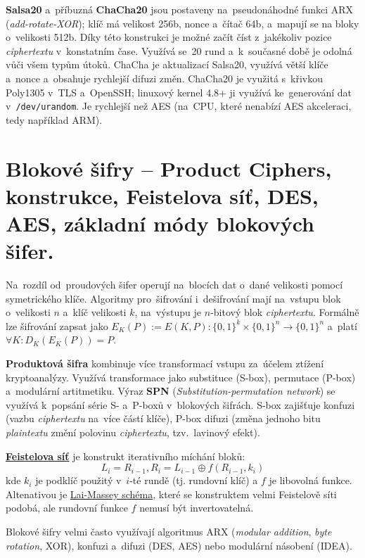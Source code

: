 \textbf{Salsa20} a~příbuzná \textbf{ChaCha20} jsou postaveny na~pseudonáhodné funkci ARX (\emph{add-rotate-XOR}); klíč má velikost 256b, nonce a~čítač 64b, a~mapují se na bloky o~velikosti 512b. Díky této konstrukci je možné začít číst z~jakékoliv pozice \emph{ciphertextu} v~konstatním čase. Využívá se~20 rund a~k~současné době je odolná vůči všem typům útoků. ChaCha je aktualizací Salsa20, využívá větší klíče a~nonce a~obsahuje rychlejší difuzi změn. ChaCha20 je využitá s~křivkou Poly1305 v~TLS a~OpenSSH; linuxový kernel 4.8+ ji využívá ke~generování dat v~\texttt{/dev/urandom}. Je rychlejší než AES (na~CPU, které nenabízí AES akceleraci, tedy například ARM).

\clearpage
\section{Blokové šifry -- Product Ciphers, konstrukce, Feistelova síť, DES, AES, základní módy blokových šifer.}

Na~rozdíl od~proudových šifer operují na~blocích dat o~dané velikosti pomocí symetrického klíče. Algoritmy pro~šifrování i~dešifrování mají na~vstupu blok o~velikosti $n$ a~klíč velikosti $k$, na~výstupu je $n$-bitový blok \emph{ciphertextu}. Formálně lze šifrování zapsat jako $E_K (P) := E(K, P): \{0, 1\}^k \times \{0, 1\}^n \rightarrow \{0, 1\}^n$ a~platí $\forall K: D_K (E_K (P)) = P$.

\textbf{Produktová šifra} kombinuje více transformací vstupu za~účelem ztížení kryptoanalýzy. Využívá transformace jako substituce (S-box), permutace (P-box) a~modulární artitmetiku. Výraz \textbf{SPN} (\emph{Substitution-permutation network}) se využívá k~popsání série S- a~P-boxů v~blokových šifrách. S-box zajišťuje konfuzi (vazbu \emph{ciphertextu} na~více částí klíče), P-box difuzi (změna jednoho bitu \emph{plaintextu} změní polovinu \emph{ciphertextu}, tzv.~lavinový efekt).

\textbf{\href{https://en.wikipedia.org/wiki/Feistel_network}{Feistelova síť}} je konstrukt iterativního míchání bloků: $$L_i = R_{i-1}, R_i = L_{i-1} \oplus f(R_{i-1}, k_i)$$ kde $k_i$ je podklíč použitý v~$i$-té rundě (tj. rundovní klíč) a $f$ je libovolná funkce. Altenativou je \href{https://en.wikipedia.org/wiki/Lai-Massey_scheme}{Lai-Massey schéma}, které se konstruktem velmi Feistelově síti podobá, ale rundovní funkce $f$ nemusí být invertovatelná.


Blokové šifry velmi často využívají algoritmus ARX (\emph{modular addition}, \emph{byte rotation}, XOR), konfuzi a~difuzi (DES, AES) nebo modulární násobení (IDEA).


